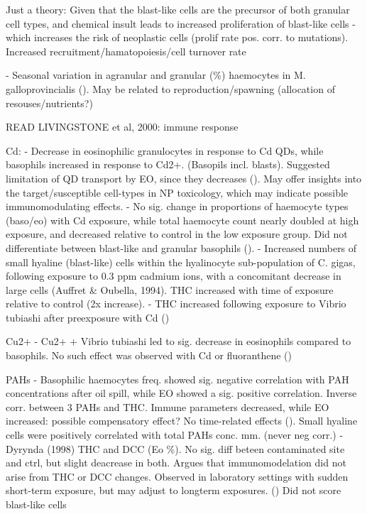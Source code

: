 Just a theory: Given that the blast-like cells are the precursor of both granular cell types, and chemical insult leads to increased proliferation of blast-like cells - which increases the risk of neoplastic cells (prolif rate pos. corr. to mutations). Increased recruitment/hamatopoiesis/cell turnover rate

- Seasonal variation in agranular and granular (\%) haemocytes in M. galloprovincialis (\cite{Santarem1994}). May be related to reproduction/spawning (allocation of resouses/nutrients?)

READ LIVINGSTONE et al, 2000: immune response


Cd:
- Decrease in eosinophilic granulocytes in response to Cd QDs, while basophils increased in response to Cd2+. (Basopils incl. blasts). Suggested limitation of QD transport by EO, since they decreases (\cite{Rocha2014}). May offer insights into the target/susceptible cell-types in NP toxicology, which may indicate possible immunomodulating effects.
- No sig. change in proportions of haemocyte types (baso/eo) with Cd exposure, while total haemocyte count nearly doubled at 
  high exposure, and decreased relative to control in the low exposure group. Did not differentiate between blast-like and granular basophils (\cite{Coles1995}). %
- Increased numbers of small hyaline (blast-like) cells within the hyalinocyte sub-population of C. gigas, following exposure 
  to 0.3 ppm cadmium ions, with a concomitant decrease in large cells (Auffret \& Oubella, 1994). THC increased with time of exposure relative to control (2x increase). %
- THC increased following exposure to Vibrio tubiashi after preexposure with Cd (\cite{Pipe1995}) %



Cu2+  
- Cu2+ + Vibrio tubiashi led to sig. decrease in eosinophils compared to basophils. No such effect was observed with Cd or fluoranthene (\cite{Pipe1995}) %

  PAHs
- Basophilic haemocytes freq. showed sig. negative correlation with PAH concentrations after oil spill, while EO showed a sig. 
  positive correlation. Inverse corr. between 3 PAHs and THC. Immune parameters decreased, while EO increased: possible compensatory effect? No time-related effects (\cite{Dyrynda1997}). Small hyaline cells were positively correlated with total PAHs conc. mm. (never neg corr.) %
- Dyrynda (1998) THC and DCC (Eo \%). No sig. diff beteen contaminated site and ctrl, but slight deacrease in both. Argues 
  that immunomodelation did not arise from THC or DCC changes. Observed in laboratory settings with sudden short-term exposure, but may adjust to longterm exposures.  (\cite{Dyrynda1998}) Did not score blast-like cells %



